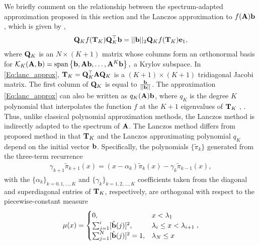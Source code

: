 \documentclass{article}
\begin{document}
We briefly comment on the relationship between the spectrum-adapted approximation proposed in this section and the Lanczos approximation 
to $f({\bf A}){\bf b}$, which is given by \cite{druskin}, \cite[Section 13.2]{higham}
\begin{align}\label{Eq:lanc_approx}
{\bf Q}_K f({\bf T}_K){\bf Q}_K^{\top} {\bf b} = ||{\bf b}||_2 {\bf Q}_K f({\bf T}_K){\bf e}_1 ,
\end{align}
where ${\bf Q}_K$ is an $N \times (K+1)$ matrix whose columns form an orthonormal basis for %
${\cal K}_K({\bf A}, {\bf b})=\hbox{span}\left\{{\bf b}, {\bf Ab}, \ldots,{\bf A}^K{\bf b}\right\},$ %
a Krylov subspace.
In \eqref{Eq:lanc_approx}, ${\bf T}_K={\bf Q}_K^{\top}{\bf A}{\bf Q}_K$ is a $(K+1) \times (K+1)$ tridiagonal Jacobi matrix. The first column of ${\bf Q}_K$ is equal to $\frac{{\bf b}}{||{\bf b}||}$. The approximation \eqref{Eq:lanc_approx} can also be written as $q_K({\bf A}){\bf b}$, where $q_K$ is the degree $K$ polynomial that interpolates the function $f$ at the $K+1$ eigenvalues of ${\bf T}_{K}$ \cite[Theorem 13.5]{higham}, \cite{saad1992analysis}. Thus, unlike %
classical polynomial approximation methods, %
the Lanczos method is 
indirectly adapted to the spectrum of ${\bf A}$. 
The Lanczos method differs from proposed method in that  ${\bf T}_{K}$ and the Lanczos approximating polynomial $q_K$ depend on the initial vector ${\bf b}$. %
Specifically, the polynomials $\{\tilde{\pi}_k\}$ generated from the three-term recurrence %
\begin{align*}
\gamma_{k+1} \tilde{\pi}_{k+1}(x) = (x-\alpha_k)\tilde{\pi}_k(x)-\gamma_k \tilde{\pi}_{k-1}(x),
\end{align*}
with the $\{\alpha_k\}_{k=0,1,\ldots,K}$ and $\{\gamma_k\}_{k=1,2,\ldots,K}$ coefficients taken from the diagonal and superdiagonal entries of ${\bf T}_K$, respectively, are orthogonal with respect to the piecewise-constant measure
\begin{align*}
\mu(x)=\begin{cases}
0, &x<\lambda_1 \\
\sum_{j=1}^i [\hat{\bf b}(j)]^2, & \lambda_i \leq x < \lambda_{i+1} \\
\sum_{j=1}^N [\hat{\bf b}(j)]^2=1, &\lambda_N \leq x
\end{cases},
\end{align*} 
\end{document}
